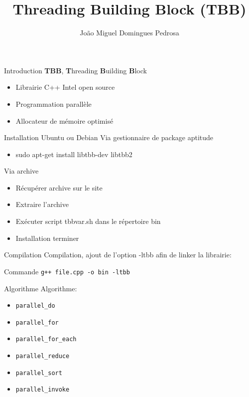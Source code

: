 \documentclass[11pt]{beamer}
\author{João Miguel Domingues Pedrosa}
\title{Threading Building Block (TBB)}
\begin{document}
\begin{frame}
\titlepage
\end{frame}


\begin{frame}{Introduction}
\textbf{TBB}, \textbf{T}hreading \textbf{B}uilding \textbf{B}lock
\begin{itemize}
	\item Librairie C++ Intel open source
	\item Programmation parallèle
	\item Allocateur de mémoire optimisé
\end{itemize}
\end{frame}

\begin{frame}{Installation}
	Ubuntu ou Debian
	Via gestionnaire de package aptitude
	\begin{itemize}
		\item sudo apt-get install libtbb-dev libtbb2
	\end{itemize}
	
	Via archive
	\begin{itemize}
		\item Récupérer archive sur le site
		\item Extraire l'archive
		\item Exécuter script tbbvar.sh dans le répertoire bin 
		\item Installation terminer
	\end{itemize}
\end{frame}

\begin{frame}{Compilation}
	Compilation, ajout de l'option -ltbb afin de linker la librairie:\\	
	\begin{block}{Commande}
		\texttt{g++ file.cpp -o bin -ltbb}
	\end{block}
\end{frame}

\begin{frame}{Algorithme}
	Algorithme:
	\begin{itemize}
	 	\item \texttt{parallel\_do}
	 	\item \texttt{parallel\_for}
	 	\item \texttt{parallel\_for\_each}
	 	\item \texttt{parallel\_reduce}
	 	\item \texttt{parallel\_sort}
	 	\item \texttt{parallel\_invoke}
	\end{itemize}
\end{frame}
\end{document}
